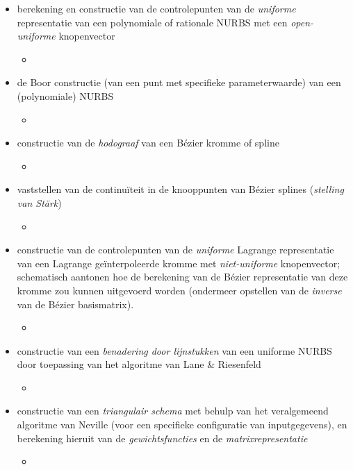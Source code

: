 \documentclass{report}
\newcommand{\vraag}[2]{
	\item #1
	
	#2
}
\begin{document}
\begin{itemize}
		\vraag{ berekening en constructie van de controlepunten van de \textit{uniforme} representatie van een polynomiale of rationale NURBS met een \textit{open-uniforme} knopenvector}{\begin{itemize} \item {} \end{itemize}}
		\vraag{ de Boor constructie (van een punt met specifieke parameterwaarde) van een (polynomiale) NURBS}{\begin{itemize} \item {} \end{itemize}}
		\vraag{ constructie van de \textit{hodograaf} van een Bézier kromme of spline}{\begin{itemize} \item {} \end{itemize}}
		\vraag{ vaststellen van de continuïteit in de knooppunten van Bézier splines (\textit{stelling van Stärk})}{\begin{itemize} \item {} \end{itemize}}
		\vraag{ constructie van de controlepunten van de \textit{uniforme} Lagrange representatie van een Lagrange geïnterpoleerde kromme met \textit{niet-uniforme} knopenvector; schematisch aantonen hoe de berekening van de Bézier representatie van deze kromme zou kunnen uitgevoerd worden (ondermeer opstellen van de \textit{inverse} van de Bézier basismatrix).}{\begin{itemize} \item {} \end{itemize}}
		\vraag{ constructie van een  \textit{benadering door lijnstukken} van een uniforme NURBS door toepassing van het algoritme van Lane \& Riesenfeld}{\begin{itemize} \item {} \end{itemize}}
		\vraag{ constructie van een \textit{triangulair schema} met behulp van het veralgemeend algoritme van Neville (voor een specifieke configuratie van inputgegevens), en berekening hieruit van de \textit{gewichtsfuncties} en de \textit{matrixrepresentatie}}{\begin{itemize} \item \todo{oplossen} \end{itemize}}
		
	\end{itemize}
	
\end{document}
